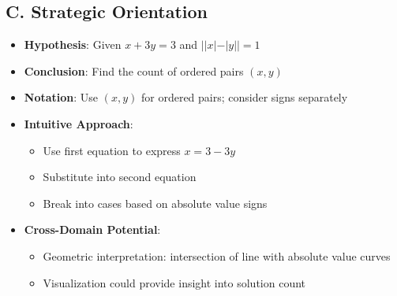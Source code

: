 \documentclass[]{article}
\begin{document}
\begin{problemconfigbox}
\subsection*{C. Strategic Orientation}
\begin{itemize}[leftmargin=*]
    \item \textbf{Hypothesis}: Given $x + 3y = 3$ and $||x| - |y|| = 1$
    \item \textbf{Conclusion}: Find the count of ordered pairs $(x,y)$
    \item \textbf{Notation}: Use $(x,y)$ for ordered pairs; consider signs separately
    \item \textbf{Intuitive Approach}: 
    \begin{itemize}
        \item Use first equation to express $x = 3 - 3y$
        \item Substitute into second equation
        \item Break into cases based on absolute value signs
    \end{itemize}
    \item \textbf{Cross-Domain Potential}: 
    \begin{itemize}
        \item Geometric interpretation: intersection of line with absolute value curves
        \item Visualization could provide insight into solution count
    \end{itemize}
\end{itemize}
\end{problemconfigbox}
\end{document}

